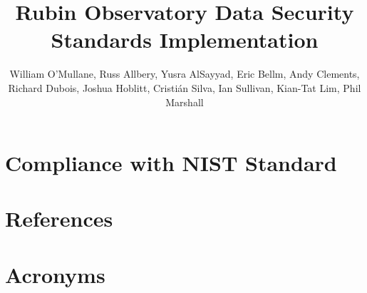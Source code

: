 \documentclass[DM,authoryear,lsstdraft,toc]{lsstdoc}
\title{Rubin Observatory Data Security Standards Implementation}
\author{%
William O'Mullane,
Russ Allbery,
Yusra AlSayyad,
Eric Bellm,
Andy Clements,
Richard Dubois,
Joshua Hoblitt,
Cristi\'{a}n Silva,
Ian Sullivan,
Kian-Tat Lim,
Phil Marshall
}
\date{\vcsDate}
\begin{document}
\maketitle


\newpage
\appendix

\section{Compliance with NIST Standard}\label{sec:compliance}


\newpage
\section{References} \label{sec:bib}
\renewcommand{\refname}{} %


\section{Acronyms} \label{sec:acronyms}
%
\printglossaries
\end{document}
